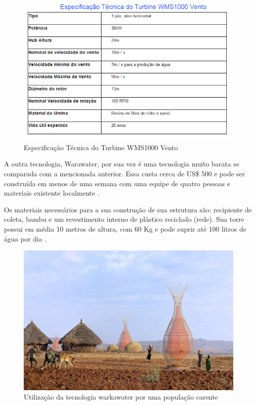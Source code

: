 \begin{figure}[!htbp]
\centering
\includegraphics[scale=0.8]{editaveis/figuras/especificacao}
\caption[Especificação Técnica do Turbine WMS1000]{Especificação Técnica do Turbine WMS1000 Vento \footnotemark}
\FloatBarrier
\label{Especificacoes}
\end{figure}
 
A outra tecnologia, Warawater, por sua vez é uma tecnologia muito barata se comparada com a mencionada anterior. 
Essa custa cerca de US\$ 500 e pode ser construída em menos de uma semana com uma equipe de quatro pessoas e materiais 
existente localmente \cite{warkawater}.

Os materiais necessários para a sua construção de sua estrutura são: recipiente de coleta, bambu e um revestimento
interno de plástico reciclado (rede). Sua torre possui em média 10 metros de altura, com 60 Kg e pode suprir até 100 litros
de água por dia \cite{warkawater2}.

\begin{figure}[!htbp]
\centering
\includegraphics[scale=0.3]{editaveis/figuras/warkawater}
\caption[Utilização da tecnologia warkawater por uma população carente]
{Utilização da tecnologia warkawater por uma população carente  \footnotemark}
\FloatBarrier
\label{Especificacoes}
\end{figure}

% 
% 

% 
